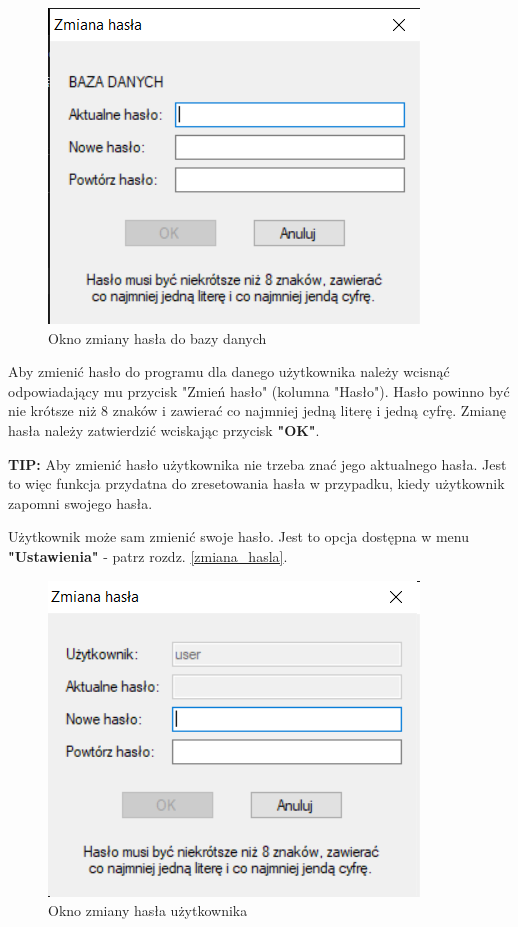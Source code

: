 \begin{figure}[htb]
	\centering
	\includegraphics{obrazki/Logowanie/zmiana_hasla_bazy.png}
	\caption{Okno zmiany hasła do bazy danych}
	\label{zmianaHaslaBazy}
\end{figure}

Aby zmienić hasło do programu dla danego użytkownika należy wcisnąć odpowiadający mu przycisk "Zmień hasło" (kolumna "Hasło"). Hasło powinno być nie krótsze niż 8 znaków i zawierać co najmniej jedną literę i jedną cyfrę. Zmianę hasła należy zatwierdzić wciskając przycisk \textbf{"OK"}.

\textbf{TIP:} Aby zmienić hasło użytkownika nie trzeba znać jego aktualnego hasła. Jest to więc funkcja przydatna do zresetowania hasła w przypadku, kiedy użytkownik zapomni swojego hasła.

Użytkownik może sam zmienić swoje hasło. Jest to opcja dostępna w menu \textbf{"Ustawienia"} - patrz rozdz. \ref{zmiana_hasla}. 

\begin{figure}[htb]
	\centering
	\includegraphics{obrazki/Logowanie/zmiana_hasla_uzytkownika.png}
	\caption{Okno zmiany hasła użytkownika}
	\label{zmianaHaslaUzytkownika}
\end{figure}
